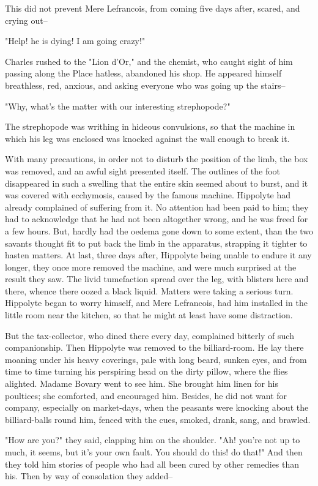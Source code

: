 \documentclass{tufte-book}
\begin{document}
This did not prevent Mere Lefrancois, from coming five days after,
scared, and crying out--

"Help! he is dying! I am going crazy!"

Charles rushed to the "Lion d'Or," and the chemist, who caught sight
of him passing along the Place hatless, abandoned his shop. He appeared
himself breathless, red, anxious, and asking everyone who was going up
the stairs--

"Why, what's the matter with our interesting strephopode?"

The strephopode was writhing in hideous convulsions, so that the machine
in which his leg was enclosed was knocked against the wall enough to
break it.

With many precautions, in order not to disturb the position of the limb,
the box was removed, and an awful sight presented itself. The outlines
of the foot disappeared in such a swelling that the entire skin seemed
about to burst, and it was covered with ecchymosis, caused by the famous
machine. Hippolyte had already complained of suffering from it. No
attention had been paid to him; they had to acknowledge that he had not
been altogether wrong, and he was freed for a few hours. But, hardly had
the oedema gone down to some extent, than the two savants thought fit
to put back the limb in the apparatus, strapping it tighter to hasten
matters. At last, three days after, Hippolyte being unable to endure it
any longer, they once more removed the machine, and were much surprised
at the result they saw. The livid tumefaction spread over the leg, with
blisters here and there, whence there oozed a black liquid. Matters
were taking a serious turn. Hippolyte began to worry himself, and Mere
Lefrancois, had him installed in the little room near the kitchen, so
that he might at least have some distraction.

But the tax-collector, who dined there every day, complained bitterly of
such companionship. Then Hippolyte was removed to the billiard-room.
He lay there moaning under his heavy coverings, pale with long beard,
sunken eyes, and from time to time turning his perspiring head on the
dirty pillow, where the flies alighted. Madame Bovary went to see him.
She brought him linen for his poultices; she comforted, and encouraged
him. Besides, he did not want for company, especially on market-days,
when the peasants were knocking about the billiard-balls round him,
fenced with the cues, smoked, drank, sang, and brawled.

"How are you?" they said, clapping him on the shoulder. "Ah! you're not
up to much, it seems, but it's your own fault. You should do this! do
that!" And then they told him stories of people who had all been cured
by other remedies than his. Then by way of consolation they added--
\end{document}
